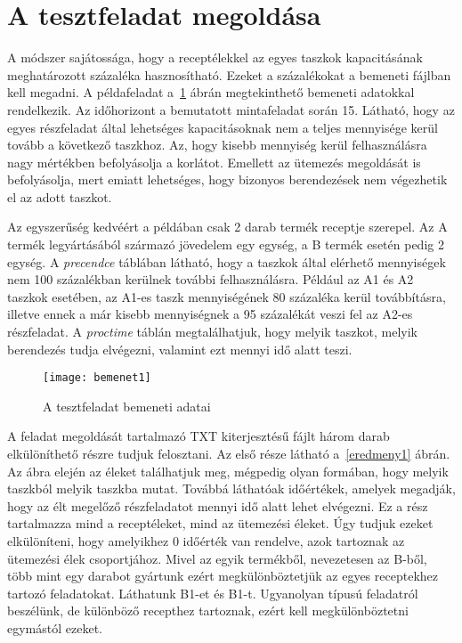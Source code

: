 \section{A tesztfeladat megoldása}
A módszer sajátossága, hogy a receptélekkel az egyes taszkok kapacitásának meghatározott százaléka hasznosítható. Ezeket a százalékokat a bemeneti fájlban kell megadni. A példafeladat a~\ref{bemenet1} ábrán megtekinthető bemeneti adatokkal rendelkezik. Az időhorizont a bemutatott mintafeladat során 15. Látható, hogy az egyes részfeladat által lehetséges kapacitásoknak nem a teljes mennyisége kerül tovább a következő taszkhoz. Az, hogy kisebb mennyiség kerül felhasználásra nagy mértékben befolyásolja a korlátot. Emellett az ütemezés megoldását is befolyásolja, mert emiatt lehetséges, hogy bizonyos berendezések nem végezhetik el az adott taszkot.

Az egyszerűség kedvéért a példában csak 2 darab termék receptje szerepel. Az A termék legyártásából származó jövedelem egy egység, a B termék esetén pedig 2 egység. A \textit{precendce} táblában látható, hogy a taszkok által elérhető mennyiségek nem 100 százalékban kerülnek további felhasználásra. Például az A1 és A2 taszkok esetében, az A1-es taszk mennyiségének 80 százaléka kerül továbbításra, illetve ennek a már kisebb mennyiségnek a 95 százalékát veszi fel az A2-es részfeladat. A \textit{proctime} táblán megtalálhatjuk, hogy melyik taszkot, melyik berendezés tudja elvégezni, valamint ezt mennyi idő alatt teszi.
 
\begin{figure}[H]
\begin{center}
\texttt{[image: bemenet1]}
\caption{A tesztfeladat bemeneti adatai}
\label{bemenet1}
\end{center}
\end{figure}

A feladat megoldását tartalmazó TXT kiterjesztésű fájlt három darab elkülöníthető részre tudjuk felosztani. Az első része látható a~\ref{eredmeny1} ábrán. Az ábra elején az éleket találhatjuk meg, mégpedig olyan formában, hogy melyik taszkból melyik taszkba mutat. Továbbá láthatóak időértékek, amelyek megadják, hogy az élt megelőző részfeladatot mennyi idő alatt lehet elvégezni. Ez a rész tartalmazza mind a receptéleket, mind az ütemezési éleket. Úgy tudjuk ezeket elkülöníteni, hogy amelyikhez 0 időérték van rendelve, azok tartoznak az ütemezési élek csoportjához. Mivel az egyik termékből, nevezetesen az B-ből, több mint egy darabot gyártunk ezért megkülönböztetjük az egyes receptekhez tartozó feladatokat. Láthatunk B1-et és B1-t. Ugyanolyan típusú feladatról beszélünk, de különböző recepthez tartoznak, ezért kell megkülönböztetni egymástól ezeket.
 

